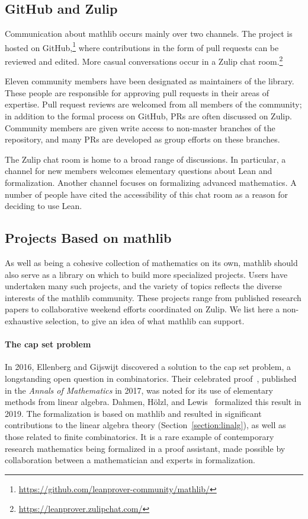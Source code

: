 \documentclass[sigplan]{acmart}\settopmatter{}
\newcommand{\mathlib}{\textsf{mathlib}\xspace}
\begin{document}
\subsection{GitHub and Zulip}
\label{subsection:community:github}

Communication about \mathlib occurs mainly over two channels.
The project is hosted on GitHub,\footnote{\url{https://github.com/leanprover-community/mathlib/}}
where contributions in the form of pull requests can be reviewed and edited.
More casual conversations occur in a Zulip chat room.\footnote{\url{https://leanprover.zulipchat.com/}}

Eleven community members have been designated as maintainers of the library.
These people are responsible for approving pull requests
in their areas of expertise.
Pull request reviews are welcomed from all members of the community;
in addition to the formal process on GitHub, PRs are often discussed on Zulip.
Community members are given write access to non-master branches of the repository,
and many PRs are developed as group efforts on these branches.

The Zulip chat room is home to a broad range of discussions.
In particular, a channel for new members welcomes elementary questions about Lean and formalization.
Another channel focuses on formalizing advanced mathematics.
A number of people have cited the accessibility of this chat room as a reason for deciding to use Lean.

\subsection{Projects Based on \mathlib}
\label{subsection:community:oneoff}

As well as being a cohesive collection of mathematics on its own, \mathlib should also serve as a library on which to build more specialized projects.
Users have undertaken many such projects, and the variety of topics reflects the diverse interests of the \mathlib community.
These projects range from published research papers to collaborative weekend efforts coordinated on Zulip.
We list here a non-exhaustive selection, to give an idea of what \mathlib can support.

\paragraph{The cap set problem} In 2016, Ellenberg and Gijswijt discovered a solution to the cap set problem, a longstanding open question in combinatorics.
Their celebrated proof~\cite{Elle17}, published in the \emph{Annals of Mathematics} in 2017, was noted for its use of elementary methods from linear algebra.
Dahmen, H\"olzl, and Lewis~\cite{Dahm19} formalized this result in 2019.
The formalization is based on \mathlib and resulted in significant contributions to the linear algebra theory (Section~\ref{section:linalg}), as well as those related to finite combinatorics.
It is a rare example of contemporary research mathematics being formalized in a proof assistant, made possible by collaboration between a mathematician and experts in formalization.
\end{document}
